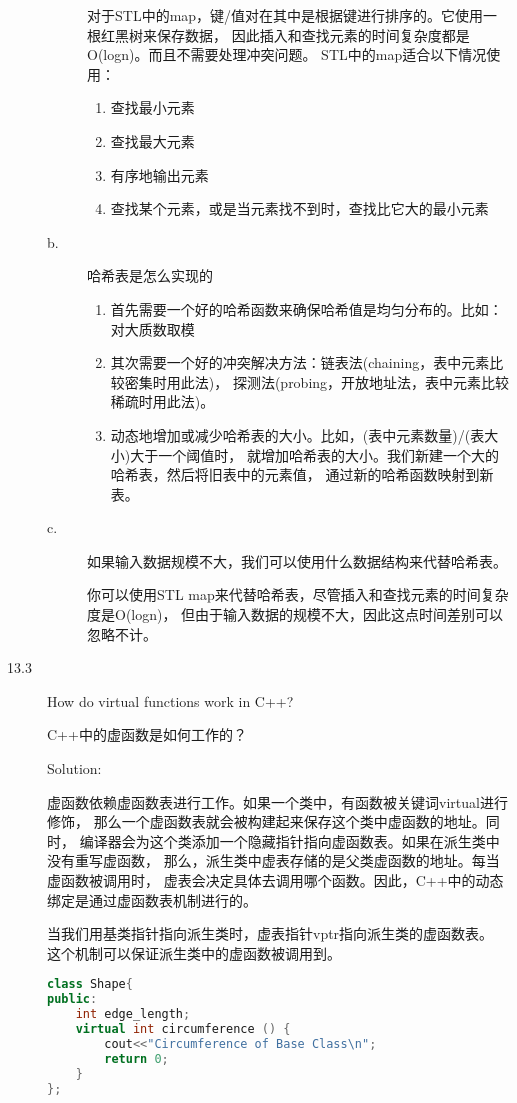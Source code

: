 \begin{description}
\begin{description}
  对于STL中的map，键/值对在其中是根据键进行排序的。它使用一根红黑树来保存数据， 因此插入和查找元素的时间复杂度都是O(logn)。而且不需要处理冲突问题。 STL中的map适合以下情况使用：
  \begin{enumerate}
  \item 查找最小元素
  \item 查找最大元素
  \item 有序地输出元素
  \item 查找某个元素，或是当元素找不到时，查找比它大的最小元素
  \end{enumerate}
\item[b.] 哈希表是怎么实现的
  \begin{enumerate}
  \item 首先需要一个好的哈希函数来确保哈希值是均匀分布的。比如：对大质数取模
  \item 其次需要一个好的冲突解决方法：链表法(chaining，表中元素比较密集时用此法)， 探测法(probing，开放地址法，表中元素比较稀疏时用此法)。
  \item 动态地增加或减少哈希表的大小。比如，(表中元素数量)/(表大小)大于一个阈值时， 就增加哈希表的大小。我们新建一个大的哈希表，然后将旧表中的元素值， 通过新的哈希函数映射到新表。
  \end{enumerate}
\item[c.] 如果输入数据规模不大，我们可以使用什么数据结构来代替哈希表。

  你可以使用STL map来代替哈希表，尽管插入和查找元素的时间复杂度是O(logn)， 但由于输入数据的规模不大，因此这点时间差别可以忽略不计。
\end{description}


\item[13.3] How do virtual functions work in C++?

C++中的虚函数是如何工作的？

Solution: 

虚函数依赖虚函数表进行工作。如果一个类中，有函数被关键词virtual进行修饰， 那么一个虚函数表就会被构建起来保存这个类中虚函数的地址。同时， 编译器会为这个类添加一个隐藏指针指向虚函数表。如果在派生类中没有重写虚函数， 那么，派生类中虚表存储的是父类虚函数的地址。每当虚函数被调用时， 虚表会决定具体去调用哪个函数。因此，C++中的动态绑定是通过虚函数表机制进行的。

当我们用基类指针指向派生类时，虚表指针vptr指向派生类的虚函数表。 这个机制可以保证派生类中的虚函数被调用到。
\begin{lstlisting}[language=C++]
class Shape{
public:
    int edge_length;
    virtual int circumference () {
        cout<<"Circumference of Base Class\n";
        return 0;
    }
};


\end{lstlisting}
\end{description}
